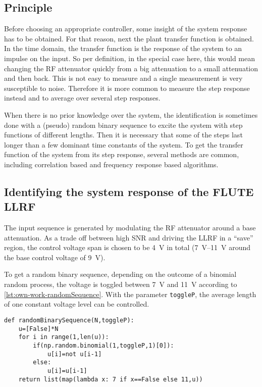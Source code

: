 \subsection{Principle}
Before choosing an appropriate controller, some insight of the system response has to be obtained. For that reason, next the plant transfer function is obtained. In the time domain, the transfer function is the response of the system to an impulse on the input. So per definition, in the special case here, this would mean changing the RF attenuator quickly from a big attenuation to a small attenuation and then back. This is not easy to measure and a single measurement is very susceptible to noise. Therefore it is more common to measure the step response instead and to average over several step responses.

When there is no prior knowledge over the system, the identification is sometimes done with a (pseudo) random binary sequence to excite the system with step functions of different lengths. Then it is necessary that some of the steps last longer than a few dominant time constants of the system. To get the transfer function of the system from its step response, several methods are common, including correlation based and frequency response based algorithms.

\subsection{Identifying the system response of the FLUTE LLRF}
The input sequence is generated by modulating the RF attenuator around a base attenuation. As a trade off between high SNR and driving the LLRF in a ``save'' region, the control voltage span is chosen to be \SI{4}{\volt} in total (\SIrange{7}{11}{\volt} around the base control voltage of \SI{9}{\volt}).

To get a random binary sequence, depending on the outcome of a binomial random process, the voltage is toggled between \SI{7}{\volt} and \SI{11}{\volt} according to \autoref{lst:own-work-randomSequence}. With the parameter \texttt{toggleP}, the average length of one constant voltage level can be controlled.

\begin{lstlisting}[style=python,caption = Function to get a random binary sequence, label = lst:own-work-randomSequence]
def randomBinarySequence(N,toggleP):
    u=[False]*N
    for i in range(1,len(u)):
        if(np.random.binomial(1,toggleP,1)[0]):
            u[i]=not u[i-1]
        else:
            u[i]=u[i-1]
    return list(map(lambda x: 7 if x==False else 11,u))
\end{lstlisting}

